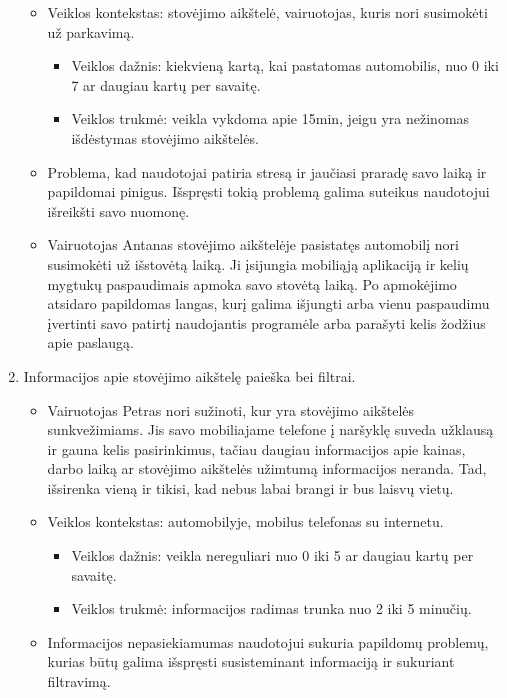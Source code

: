 \documentclass{VUMIFPSkursinis}
\begin{document}
\begin{enumerate}[label = \textbf{PV\arabic*.}]
\begin{itemize}[label={-}]
			\item Veiklos kontekstas: stovėjimo aikštelė, vairuotojas, kuris nori susimokėti už parkavimą.
				\begin{itemize}[label={$\bullet$}]
					\item Veiklos dažnis: kiekvieną kartą, kai pastatomas automobilis, nuo 0 iki 7 ar daugiau kartų per savaitę. 
					\item Veiklos trukmė: veikla vykdoma apie 15min, jeigu yra nežinomas išdėstymas stovėjimo aikštelės.
				\end{itemize}
			\item Problema, kad naudotojai patiria stresą ir jaučiasi praradę savo laiką ir papildomai pinigus. Išspręsti tokią problemą galima suteikus naudotojui išreikšti savo nuomonę.

			\item Vairuotojas Antanas stovėjimo aikštelėje pasistatęs automobilį nori susimokėti už išstovėtą laiką. Ji įsijungia mobiliąją aplikaciją ir kelių mygtukų paspaudimais apmoka savo stovėtą laiką. Po apmokėjimo atsidaro papildomas langas, kurį galima išjungti arba vienu paspaudimu įvertinti savo patirtį naudojantis programėle arba parašyti kelis žodžius apie paslaugą.
			
		\end{itemize}
	\item Informacijos apie stovėjimo aikštelę paieška bei filtrai.
		\begin{itemize}[label={-}]
			\item Vairuotojas Petras nori sužinoti, kur yra stovėjimo aikštelės sunkvežimiams. Jis savo mobiliajame telefone į naršyklę suveda užklausą ir gauna kelis pasirinkimus, tačiau daugiau informacijos apie kainas, darbo laiką ar stovėjimo aikštelės užimtumą informacijos neranda. Tad, išsirenka vieną ir tikisi, kad nebus labai brangi ir bus laisvų vietų.

			\item Veiklos kontekstas: automobilyje, mobilus telefonas su internetu.
				\begin{itemize}[label={$\bullet$}]
					\item Veiklos dažnis: veikla nereguliari nuo 0 iki 5 ar daugiau kartų per savaitę.
					\item Veiklos trukmė: informacijos radimas trunka nuo 2 iki 5 minučių.
				\end{itemize}
			\item Informacijos nepasiekiamumas naudotojui sukuria papildomų problemų, kurias būtų galima išspręsti susisteminant informaciją ir sukuriant filtravimą.


\end{itemize}
\end{enumerate}
\end{document}
